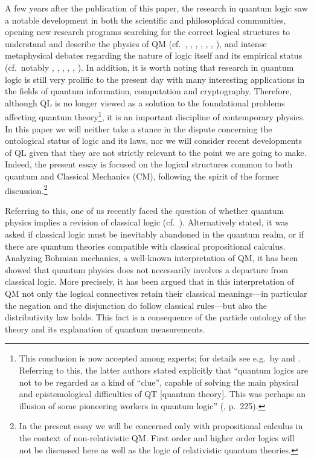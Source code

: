 \documentclass[11pt, executivepaper]{article}
\begin{document}
A few years after the publication of this paper, the research in quantum logic saw a notable development in both the scientific and philosophical communities, opening new research programs searching for the correct logical structures to understand and describe the physics of QM (cf.\ \cite{Reichenbach:1944}, \cite{Mackey:1957}, \cite{Finkelstein:1963}, \cite{Kochen:1965}, \cite{Jauch:1969}, \cite{Giuntini:2002}, \cite{DallaChiara:2004}), and intense metaphysical debates regarding the nature of logic itself and its empirical status (cf.\ notably \cite{Quine:1951}, \cite{Putnam:1968}, \cite{Dummett:1976}, \cite{Hallett:1982}, \cite{Weingartner:2004}, \cite{Bacciagaluppi:2009}). In addition, it is worth noting that research in quantum logic is still very prolific to the present day with many interesting applications in the fields of quantum information, computation and cryptography. Therefore, although QL is no longer viewed as a solution to the foundational problems affecting quantum theory\footnote{This conclusion is now accepted among experts; for details see e.g.\ by \cite{Bacciagaluppi:2009} and \cite{Giuntini:2002}. Referring to this, the latter authors stated explicitly that ``quantum logics are not to be regarded as a kind of ``clue'', capable of solving the main physical and epistemological difficulties of QT [quantum theory]. This was perhaps an illusion of some pioneering workers in quantum logic'' (\cite{Giuntini:2002}, p.\ 225).}, it is an important discipline of contemporary physics. In this paper we will neither take a stance in the dispute concerning the ontological status of logic and its laws, nor we will consider recent developments of QL given that they are not strictly relevant to the point we are going to make. Indeed, the present essay is focused on the logical structures common to both quantum and Classical Mechanics (CM), following the spirit of the former discussion.\footnote{In the present essay we will be concerned only with propositional calculus in the context of non-relativistic QM. First order and higher order logics will not be discussed here as well as the logic of relativistic quantum theories.} 

Referring to this, one of us recently faced the question of whether quantum physics implies a revision of classical logic (cf.\ \cite{Oldofredi:2020}). Alternatively stated, it was asked if classical logic must be inevitably abandoned in the quantum realm, or if there are quantum theories compatible with classical propositional calculus. Analyzing Bohmian mechanics, a well-known interpretation of QM, it has been showed that quantum physics does not necessarily involves a departure from classical logic. More precisely, it has been argued that in this interpretation of QM not only the logical connectives retain their classical meanings---in particular the negation and the disjunction do follow classical rules---but also the distributivity law holds. This fact is a consequence of the particle ontology of the theory and its explanation of quantum measurements.
\end{document}
